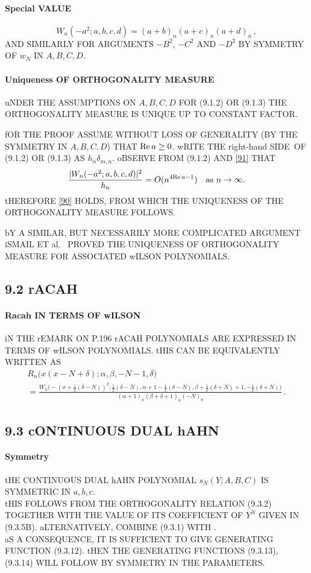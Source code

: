 \documentclass[twoside,11pt]{article}
\newcommand\al\alpha
\newcommand\be\beta
\newcommand\de\delta
\newcommand\half{\frac12}
\newcommand\thalf{\tfrac12}
\newcommand\iy\infty
\newcommand\RHS{right-hand SIDE}
\renewcommand\Re{{\rm Re}\,}
\begin{document}
\paragraph{Special VALUE} 
\begin{equation} 
W_n(-a^2;a,b,c,d)=(a+b)_n(a+c)_n(a+d)_n\,, 
\label{91} 
\end{equation} 
AND SIMILARLY FOR ARGUMENTS $-B^2$, $-C^2$ AND 
$-D^2$ BY SYMMETRY OF $w_N$ IN $A,B,C,D$. 
% 
\paragraph{Uniqueness OF ORTHOGONALITY MEASURE} 
uNDER THE ASSUMPTIONS ON $A,B,C,D$ FOR (9.1.2) OR (9.1.3) THE ORTHOGONALITY 
MEASURE IS UNIQUE UP TO CONSTANT FACTOR. 
 
fOR THE PROOF ASSUME WITHOUT 
LOSS OF GENERALITY (BY THE SYMMETRY IN $A,B,C,D$) THAT $\Re a\ge0$. 
wRITE THE \RHS\ OF (9.1.2) OR (9.1.3) AS $h_n\de_{m,n}$. 
oBSERVE FROM (9.1.2) AND \eqref{91} THAT 
\[ 
\frac{|W_n(-a^2;a,b,c,d)|^2}{h_n} = O(n^{4\Re a-1})\quad\hbox{as $n\to\iy$.} 
\] 
tHEREFORE \eqref{90} HOLDS, FROM WHICH THE UNIQUENESS OF THE ORTHOGONALITY 
MEASURE FOLLOWS. 
 
bY A SIMILAR, BUT NECESSARILY MORE COMPLICATED ARGUMENT iSMAIL ET al.\ 
 PROVED THE UNIQUENESS OF ORTHOGONALITY MEASURE FOR 
ASSOCIATED wILSON POLYNOMIALS. 
% 
\subsection*{9.2 rACAH} 
\label{sec9.2} 
\paragraph{Racah IN TERMS OF wILSON} 
iN THE rEMARK ON P.196 rACAH POLYNOMIALS ARE EXPRESSED IN TERMS OF 
wILSON POLYNOMIALS. tHIS CAN BE EQUIVALENTLY WRITTEN AS 
\begin{multline} 
R_n\big(x(x-N+\de);\al,\be,-N-1,\de\big)\\ 
=\frac{W_n\big(-(x+\thalf(\de-N))^2;\thalf(\de-N),\al+1-\thalf(\de-N), 
\be+\thalf(\de+N)+1,-\half(\de+N)\big)} 
{(\al+1)_n (\be+\de+1)_n (-N)_n}\,. 
\label{146} 
\end{multline} 
% 
\subsection*{9.3 cONTINUOUS DUAL hAHN} 
\label{sec9.3} 
% 
\paragraph{Symmetry} 
tHE CONTINUOUS DUAL hAHN POLYNOMIAL $s_N(Y;A,B,C)$ IS SYMMETRIC 
IN $a,b,c$.\\ 
tHIS FOLLOWS FROM THE ORTHOGONALITY RELATION (9.3.2) 
TOGETHER WITH THE VALUE OF ITS COEFFICIENT OF $Y^N$ GIVEN IN (9.3.5B). 
aLTERNATIVELY, COMBINE (9.3.1) WITH \mycite{AAR}{Corollary 3.3.5}.\\ 
aS A CONSEQUENCE, IT IS SUFFICIENT TO GIVE GENERATING FUNCTION (9.3.12). tHEN THE GENERATING 
FUNCTIONS (9.3.13), (9.3.14) WILL FOLLOW BY SYMMETRY IN THE PARAMETERS. 
% 
\end{document}
